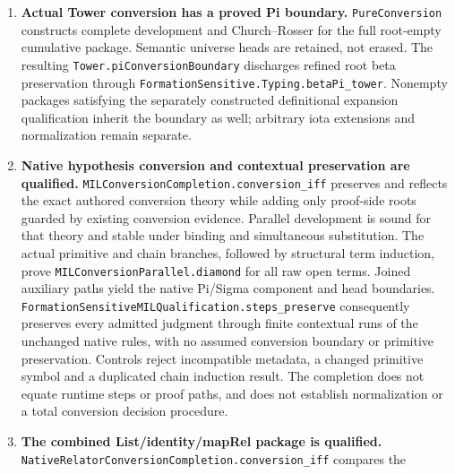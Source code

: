 \documentclass[11pt]{article}
\theoremstyle{definition}
\theoremstyle{remark}
\begin{document}
\begin{enumerate}
  not native identity or a semantic extensionality axiom.
  \nolinkurl{FormationSensitiveHOLUniformList} represents the actual list
  equations, predicate-quantified induction and map-length conclusion using
  thirteen opaque declarations with four distinct carriers. Formation and
  function-valued substitution are checked. The source HOL derivation remains
  distinct from formation of its represented native proposition. The
  specialized chart reconstruction reaches that same represented conclusion;
  it does not turn proposition formation into a native proof inhabitant.
  No proof-as-inhabitant translation or final Prime logic is selected.
\item \textbf{Actual Tower conversion has a proved Pi boundary.}
  \nolinkurl{PureConversion} constructs complete development and
  Church--Rosser for the full root-empty cumulative package. Semantic
  universe heads are retained, not erased. The resulting
  \nolinkurl{Tower.piConversionBoundary} discharges refined root beta
  preservation through \nolinkurl{FormationSensitive.Typing.betaPi_tower}.
  Nonempty packages satisfying the separately constructed definitional
  expansion qualification inherit the boundary as well; arbitrary iota
  extensions and normalization remain separate.
\item \textbf{Native hypothesis conversion and contextual preservation are qualified.}
  \nolinkurl{MILConversionCompletion.conversion_iff} preserves and reflects
  the exact authored conversion theory while adding only proof-side roots
  guarded by existing conversion evidence. Parallel development is sound for
  that theory and stable under binding and simultaneous substitution.
  The actual primitive and chain branches, followed by structural term
  induction, prove \nolinkurl{MILConversionParallel.diamond} for all raw open
  terms. Joined auxiliary paths yield the native Pi/Sigma component and head
  boundaries. \nolinkurl{FormationSensitiveMILQualification.steps_preserve}
  consequently preserves every admitted judgment through finite contextual
  runs of the unchanged native rules, with no assumed conversion boundary
  or primitive preservation. Controls reject incompatible metadata, a changed
  primitive symbol and a duplicated chain induction result. The completion
  does not equate runtime steps or proof paths, and does not establish
  normalization or a total conversion decision procedure.
\item \textbf{The combined List/identity/mapRel package is qualified.}
  \nolinkurl{NativeRelatorConversionCompletion.conversion_iff} compares the

\end{enumerate}
\end{document}
